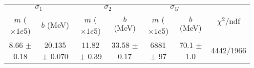 \begin{tabular}{cc|cc|cc||c}
\multicolumn{2}{c|}{$\sigma_1$} & \multicolumn{2}{|c}{$\sigma_2$} & \multicolumn{2}{|c}{$\sigma_G$}  & \multirow{2}{*}{$\chi^2/$ndf}\\
$m$ ($\times1e5$) & $b$ (MeV) & $m$ ($\times1e5$) & $b$ (MeV) & $m$ ($\times1e5$) & $b$ (MeV) & \\
\hline
8.66 $\pm$ 0.18 & 20.135 $\pm$ 0.070 & 11.82 $\pm$ 0.39 & 33.58 $\pm$ 0.17 & 6881 $\pm$ 97 & 70.1 $\pm$ 1.0 & 4442/1966\\
\end{tabular}
